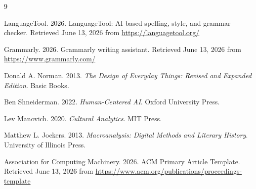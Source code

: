 \documentclass[sigconf]{acmart}
\begin{document}
\begin{thebibliography}{9}

LanguageTool. 2026. LanguageTool: AI-based spelling, style, and grammar checker. Retrieved June 13, 2026 from \url{https://languagetool.org/}

Grammarly. 2026. Grammarly writing assistant. Retrieved June 13, 2026 from \url{https://www.grammarly.com/}

Donald A. Norman. 2013. \textit{The Design of Everyday Things: Revised and Expanded Edition}. Basic Books.

Ben Shneiderman. 2022. \textit{Human-Centered AI}. Oxford University Press.

Lev Manovich. 2020. \textit{Cultural Analytics}. MIT Press.

Matthew L. Jockers. 2013. \textit{Macroanalysis: Digital Methods and Literary History}. University of Illinois Press.

Association for Computing Machinery. 2026. ACM Primary Article Template. Retrieved June 13, 2026 from \url{https://www.acm.org/publications/proceedings-template}

\end{thebibliography}
\end{document}
